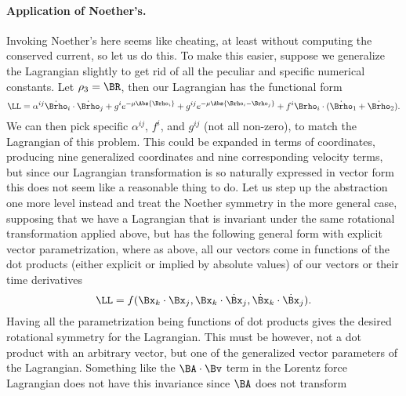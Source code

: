 {\paragraph{Application of Noether's.}
Invoking Noether's here seems like cheating, at least without computing the conserved current, so let us do this.
%
%
To make this easier, suppose we generalize the Lagrangian slightly to get rid of all the peculiar and specific numerical constants.  Let
\(\rho_3 = \BR\), then our Lagrangian has the functional form
%
\begin{equation}\label{eqn:goldsteinCh12:280}
\LL = \alpha^{ij} \dot{\Brho}_i \cdot \dot{\Brho}_j
+ g^i e^{-\mu \Abs{\Brho_i}}
+ g^{ij} e^{-\mu \Abs{ \Brho_i - \Brho_j }}
+ f^i \Brho_i \cdot ( \dot{\Brho}_1 + \dot{\Brho}_2 ).
\end{equation}
%
We can then pick specific \(\alpha^{ij}\), \(f^{i}\), and \(g^{ij}\) (not all non-zero), to match the Lagrangian of this problem.
This could be expanded in terms of coordinates, producing nine generalized coordinates and nine corresponding velocity terms, but
since our Lagrangian transformation is so naturally expressed in vector form this does not seem like a reasonable thing to do.
%
Let us step up the abstraction one more level instead and treat the Noether symmetry in the more general case, supposing that we have
a Lagrangian that is invariant under the same rotational transformation applied above, but has the following general form with explicit
vector parametrization, where as above, all our vectors come in functions of the dot products (either explicit or implied by
absolute values) of our vectors or their time derivatives
%
\begin{equation}\label{eqn:goldsteinCh12:300}
\LL = f( {\Bx_k} \cdot {{\Bx}_j}, {\Bx_k} \cdot {\dot{\Bx}_j}, {\dot{\Bx}_k} \cdot {\dot{\Bx}_j} ).
\end{equation}
%
Having all the parametrization being functions of dot products gives the desired rotational symmetry for the Lagrangian.
This must be however, not a dot product with an arbitrary vector, but one of the generalized vector parameters of the Lagrangian.
Something like the \(\BA \cdot \Bv\) term in the Lorentz force Lagrangian does not have this invariance since \(\BA\) does not transform
}
